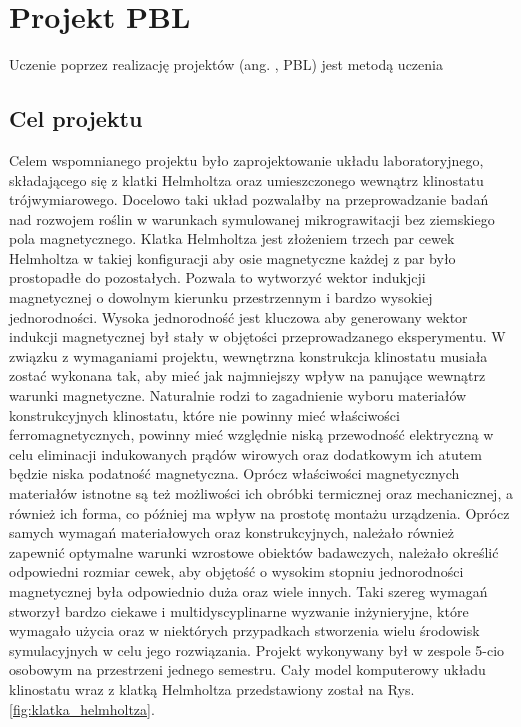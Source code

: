 \graphicspath{{./PBL/images}}

\chapter{Projekt PBL}

Uczenie poprzez realizację projektów (ang. , PBL) jest metodą uczenia 

\section{Cel projektu} \label{cel_projektu}

Celem wspomnianego projektu było zaprojektowanie układu laboratoryjnego, składającego się z klatki Helmholtza oraz umieszczonego wewnątrz klinostatu trójwymiarowego. Docelowo taki układ pozwalałby na przeprowadzanie badań nad rozwojem roślin w warunkach symulowanej mikrograwitacji bez ziemskiego pola magnetycznego. Klatka Helmholtza jest złożeniem trzech par cewek Helmholtza w takiej konfiguracji aby osie magnetyczne każdej z par było prostopadłe do pozostałych. Pozwala to wytworzyć wektor indukjcji magnetycznej o dowolnym kierunku przestrzennym i bardzo wysokiej jednorodności. Wysoka jednorodność jest kluczowa aby generowany wektor indukcji magnetycznej był stały w objętości przeprowadzanego eksperymentu. W związku z wymaganiami projektu, wewnętrzna konstrukcja klinostatu musiała zostać wykonana tak, aby mieć jak najmniejszy wpływ na panujące wewnątrz warunki magnetyczne. Naturalnie rodzi to zagadnienie wyboru materiałów konstrukcyjnych klinostatu, które nie powinny mieć właściwości ferromagnetycznych, powinny mieć względnie niską przewodność elektryczną w celu eliminacji indukowanych prądów wirowych oraz dodatkowym ich atutem będzie niska podatność magnetyczna. Oprócz właściwości magnetycznych materiałów istnotne są też możliwości ich obróbki termicznej oraz mechanicznej, a również ich forma, co później ma wpływ na prostotę montażu urządzenia. Oprócz samych wymagań materiałowych oraz konstrukcyjnych, należało również zapewnić optymalne warunki wzrostowe obiektów badawczych, należało określić odpowiedni rozmiar cewek, aby objętość o wysokim stopniu jednorodności magnetycznej była odpowiednio duża oraz wiele innych. Taki szereg wymagań stworzył bardzo ciekawe i multidyscyplinarne wyzwanie inżynieryjne, które wymagało użycia oraz w niektórych przypadkach stworzenia wielu środowisk symulacyjnych w celu jego rozwiązania. Projekt wykonywany był w zespole 5-cio osobowym na przestrzeni jednego semestru. Cały model komputerowy układu klinostatu wraz z klatką Helmholtza przedstawiony został na Rys. \ref{fig:klatka_helmholtza}.

